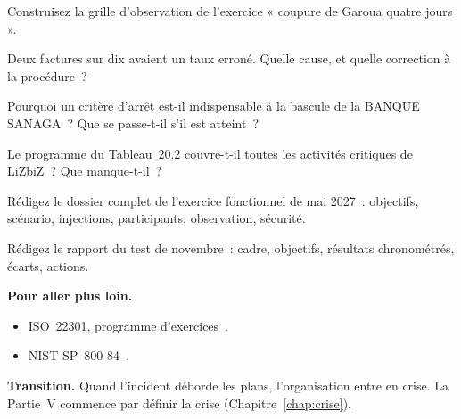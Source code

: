 \begin{boxexo}[title={\ding{45}\quad Exercice~20.5. Observation \niveaumoyen}]
Construisez la grille d'observation de l'exercice « coupure de Garoua
quatre jours ».
\end{boxexo}

\begin{boxexo}[title={\ding{45}\quad Exercice~20.6. Les paramètres \niveaumoyen}]
Deux factures sur dix avaient un taux erroné. Quelle cause, et quelle
correction à la procédure~?
\end{boxexo}

\begin{boxexo}[title={\ding{45}\quad Exercice~20.7. Critère d'arrêt \niveaumoyen}]
Pourquoi un critère d'arrêt est-il indispensable à la bascule de la
BANQUE SANAGA~? Que se passe-t-il s'il est atteint~?
\end{boxexo}

\begin{boxexo}[title={\ding{45}\quad Exercice~20.8. Programme \niveaumoyen}]
Le programme du Tableau~20.2 couvre-t-il toutes les activités critiques de
LiZbiZ~? Que manque-t-il~?
\end{boxexo}

\begin{boxexo}[title={\ding{45}\quad Exercice~20.9. Un dossier d'exercice \niveauexpert}]
Rédigez le dossier complet de l'exercice fonctionnel de mai 2027~:
objectifs, scénario, injections, participants, observation, sécurité.
\end{boxexo}

\begin{boxexo}[title={\ding{45}\quad Exercice~20.10. Rapport d'exercice \niveauexpert}]
Rédigez le rapport du test de novembre~: cadre, objectifs, résultats
chronométrés, écarts, actions.
\end{boxexo}

\bigskip

\begin{boxinfo}
\textbf{Pour aller plus loin.}
\begin{itemize}
    \item ISO~22301, programme d'exercices~\cite{iso22301_2019}.
    \item NIST SP~800-84~\cite{nist80084}.
\end{itemize}
\end{boxinfo}

\begin{boxinfo}
\textbf{Transition.} Quand l'incident déborde les plans, l'organisation
entre en crise. La Partie~V commence par définir la crise
(Chapitre~\ref{chap:crise}).
\end{boxinfo}
